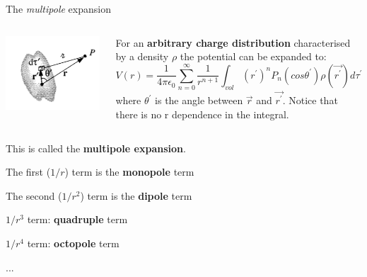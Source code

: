 
%
%
%

\begin{frame}{The {\em multipole} expansion}

\begin{columns}
  \begin{column}{0.30\textwidth}
   \begin{center}
     \includegraphics[width=0.99\textwidth]{./images/schematics/continuous_charge_distribution_1.png}\\
   \end{center}
  \end{column}
  \begin{column}{0.70\textwidth}
    For an {\bf arbitrary charge distribution} characterised by a density $\rho$
    the potential can be expanded to:
    \begin{equation*}
      V(r) = \frac{1}{4\pi\epsilon_0} \sum_{n=0}^{\infty} \frac{1}{r^{n+1}}
        \int_{vol} (r^{\prime})^{n} P_{n}(cos\theta^{\prime}) \rho(\vec{r^{\prime}}) d{\tau}^{\prime}
    \end{equation*}
    where $\theta^{\prime}$ is the angle between $\vec{r}$ and $\vec{r^{\prime}}$.
    Notice that there is no r dependence in the integral.\\
  \end{column}
\end{columns}

\vspace{0.3cm}

This is called the {\bf multipole expansion}.
\begin{itemize}
{\small
  \item The first ($1/r$) term is the {\bf monopole} term
  \item The second ($1/r^2$) term is the {\bf dipole} term
  \item $1/r^3$ term: {\bf quadruple} term
  \item $1/r^4$ term: {\bf octopole} term
  \item ...
}
\end{itemize}

\end{frame}

